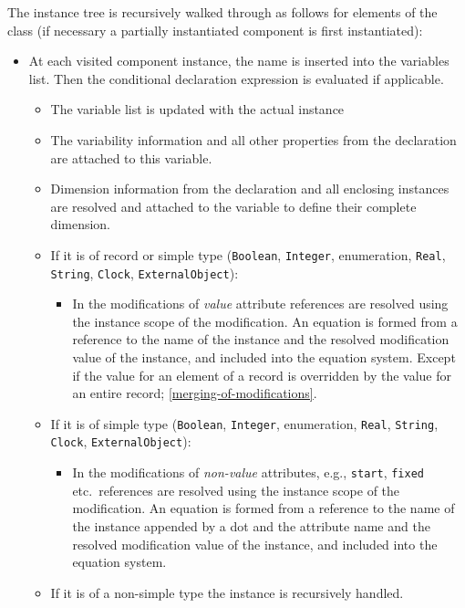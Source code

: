 The instance tree is recursively walked through as follows for elements of the class (if necessary a partially instantiated component is first instantiated):
\begin{itemize}
\item
  At each visited component instance, the name is inserted into the variables list.
  Then the conditional declaration expression is evaluated if applicable.
  \begin{itemize}
  \item
    The variable list is updated with the actual instance
  \item
    The variability information and all other properties from the declaration are attached to this variable.
  \item
    Dimension information from the declaration and all enclosing instances are resolved and attached to the variable to define their complete dimension.
  \item
    If it is of record or simple type (\lstinline!Boolean!, \lstinline!Integer!, enumeration, \lstinline!Real!, \lstinline!String!, \lstinline!Clock!, \lstinline!ExternalObject!):
    \begin{itemize}
    \item
      In the modifications of \emph{value} attribute references are resolved using the instance scope of the modification.
      An equation is formed from a reference to the name of the instance and the resolved modification value of the instance, and included into the equation system.
      Except if the value for an element of a record is overridden by the value for an entire record; \cref{merging-of-modifications}.
    \end{itemize}
  \item
    If it is of simple type (\lstinline!Boolean!, \lstinline!Integer!, enumeration, \lstinline!Real!, \lstinline!String!, \lstinline!Clock!, \lstinline!ExternalObject!):
    \begin{itemize}
    \item
      In the modifications of \emph{non-value} attributes, e.g., \lstinline!start!, \lstinline!fixed! etc.\ references are resolved using the instance scope of the modification.
      An equation is formed from a reference to the name of the instance appended by a dot and the attribute name and the resolved modification value of the instance, and included into the equation system.
    \end{itemize}
  \item
    If it is of a non-simple type the instance is recursively handled.

\end{itemize}
\end{itemize}
